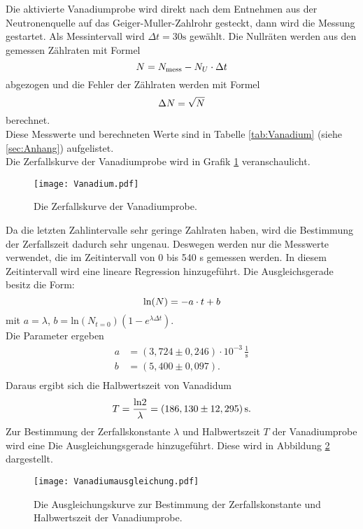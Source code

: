 Die aktivierte Vanadiumprobe wird direkt nach dem Entnehmen aus der Neutronenquelle auf das Geiger-Muller-Zahlrohr gesteckt,
 dann wird die Messung gestartet. Als Messintervall wird $\Delta t =30 \text{s}$ gewählt.
Die Nullräten werden aus den gemessen Zählraten mit  Formel
\begin{equation}
  N = N_\text{mess}-N_U \cdot \Delta t \\
 \end{equation}
 abgezogen und die Fehler der Zählraten werden mit Formel
 \begin{equation}
  \Delta N = \sqrt{N}\\
 \end{equation}
 berechnet.\\
 Diese Messwerte und berechneten Werte sind in Tabelle \ref{tab:Vanadium} (siehe \ref{sec:Anhang}) aufgelistet. \\
Die Zerfallskurve der Vanadiumprobe wird in Grafik \ref{fig:Vanadium} veranschaulicht.
\begin{figure}[H]
  \centering
  \texttt{[image: Vanadium.pdf]}
  \caption{Die Zerfallskurve der Vanadiumprobe.}
  \label{fig:Vanadium}
\end{figure}
\noindent
Da die letzten Zahlintervalle sehr geringe Zahlraten haben, wird die Bestimmung der Zerfallszeit  dadurch sehr ungenau.
Deswegen werden nur die Messwerte verwendet, die im Zeitintervall von 0 bis 540 s gemessen werden.
In diesem Zeitintervall wird eine lineare Regression hinzugeführt.
Die Ausgleichsgerade besitz die Form:
\begin{equation}
 \text{ln}(N)=-a\cdot t+b \\
\end{equation}
mit \(a= \lambda\), \(b=\text{ln}(N_{t=0})(1-e^{\lambda \Delta t})\).\\
Die Parameter ergeben 
\begin{align*}
  a &=(3,724 \pm0,246 ) \cdot 10^{-3}\,\mathrm{\frac{1}{s}} \\
  b &=(5,400 \pm0,097 ) .\\
 \end{align*}
\noindent Daraus ergibt sich die Halbwertszeit von Vanadidum 
 \begin{equation}
 T= \frac{\text{ln}2}{\lambda}= (186,130 \pm 12,295)\,\mathrm{s}.\\
 \end{equation}
 \noindent Zur Bestimmung der Zerfallskonstante $\lambda$ und Halbwertszeit $T$ der Vanadiumprobe wird eine Die Ausgleichungsgerade hinzugeführt.
  Diese wird in Abbildung \ref{fig:Vanadiumausgleichung} dargestellt. 
\begin{figure}[H]
  \centering
  \texttt{[image: Vanadiumausgleichung.pdf]}
  \caption{Die Ausgleichungskurve zur Bestimmung der Zerfallskonstante und Halbwertszeit der Vanadiumprobe.}
  \label{fig:Vanadiumausgleichung}
\end{figure}


